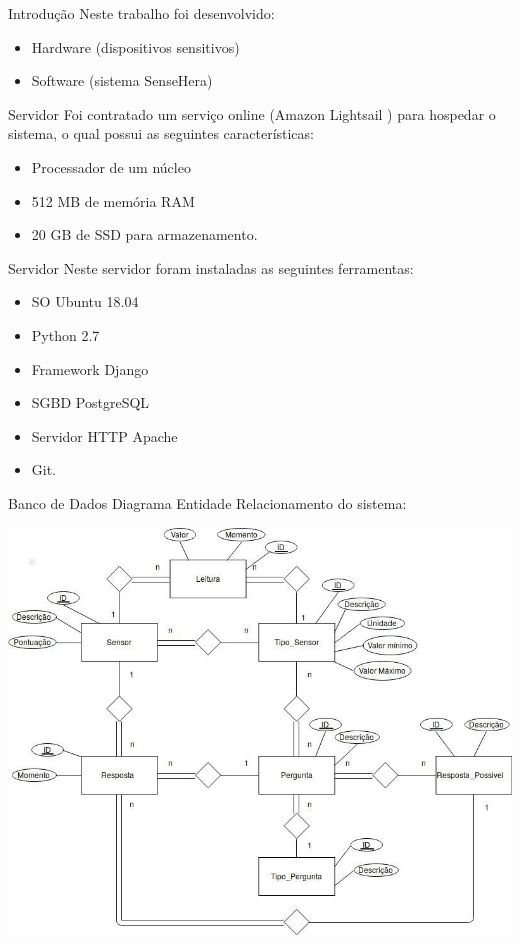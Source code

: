 \documentclass{beamer}
\begin{document}
  \begin{frame}{Introdução}
    \quad Neste trabalho foi desenvolvido:
    \begin{itemize}
      \item Hardware (dispositivos sensitivos)
      \item Software (sistema SenseHera)
    \end{itemize}
  \end{frame}

  \begin{frame}{Servidor}
    \quad Foi contratado um serviço online (Amazon Lightsail \cite{lightsail}) para hospedar o sistema, o qual possui as seguintes características:
    \begin{itemize}
      \item Processador de um núcleo
      \item 512 MB de memória RAM
      \item 20 GB de SSD para armazenamento.
    \end{itemize}
  \end{frame}
  \begin{frame}{Servidor}
    \quad Neste servidor foram instaladas as seguintes ferramentas:
    \begin{itemize}
      \item SO Ubuntu 18.04
      \item Python 2.7
      \item Framework Django
      \item SGBD PostgreSQL
      \item Servidor HTTP Apache
      \item Git.
    \end{itemize}
  \end{frame}

  \begin{frame}{Banco de Dados}
    \quad Diagrama Entidade Relacionamento do sistema:
    \begin{center}
    \includegraphics[scale=0.3]{tccDER}
    \end{center}
  \end{frame}
\end{document}
